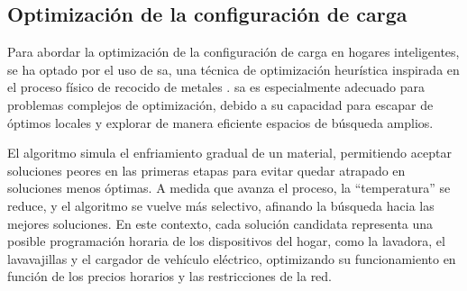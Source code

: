\documentclass[11pt,a4paper]{book}
\begin{document}
\subsection{Optimización de la configuración de carga} 


Para abordar la optimización de la configuración de carga en hogares inteligentes, se ha optado por el uso de \gls{sa}, una técnica de optimización heurística inspirada en el proceso físico de recocido de metales \cite{kirkpatrick1983}. \gls{sa} es especialmente adecuado para problemas complejos de optimización, debido a su capacidad para escapar de óptimos locales y explorar de manera eficiente espacios de búsqueda amplios.

El algoritmo simula el enfriamiento gradual de un material, permitiendo aceptar soluciones peores en las primeras etapas para evitar quedar atrapado en soluciones menos óptimas. A medida que avanza el proceso, la “temperatura” se reduce, y el algoritmo se vuelve más selectivo, afinando la búsqueda hacia las mejores soluciones. En este contexto, cada solución candidata representa una posible programación horaria de los dispositivos del hogar, como la lavadora, el lavavajillas y el cargador de vehículo eléctrico, optimizando su funcionamiento en función de los precios horarios y las restricciones de la red.
\end{document}
